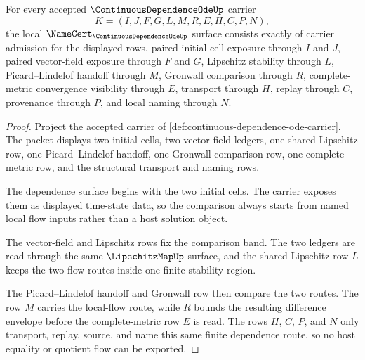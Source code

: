 \begin{theorem}
\label{thm:continuous-dependence-ode-namecert-obligations}
For every accepted $\ContinuousDependenceOdeUp$ carrier
$$
K=(I,J,F,G,L,M,R,E,H,C,P,N),
$$
the local $\NameCert_{\ContinuousDependenceOdeUp}$ surface consists exactly of carrier admission for the displayed rows, paired initial-cell exposure through $I$ and $J$, paired vector-field exposure through $F$ and $G$, Lipschitz stability through $L$, Picard--Lindelof handoff through $M$, Gronwall comparison through $R$, complete-metric convergence visibility through $E$, transport through $H$, replay through $C$, provenance through $P$, and local naming through $N$.
\end{theorem}
\begin{proof}
Project the accepted carrier of \autoref{def:continuous-dependence-ode-carrier}. The packet displays two initial cells, two vector-field ledgers, one shared Lipschitz row, one Picard--Lindelof handoff, one Gronwall comparison row, one complete-metric row, and the structural transport and naming rows.

The dependence surface begins with the two initial cells. The carrier exposes them as displayed time-state data, so the comparison always starts from named local flow inputs rather than a host solution object.

The vector-field and Lipschitz rows fix the comparison band. The two ledgers are read through the same $\LipschitzMapUp$ surface, and the shared Lipschitz row $L$ keeps the two flow routes inside one finite stability region.

The Picard--Lindelof handoff and Gronwall row then compare the two routes. The row $M$ carries the local-flow route, while $R$ bounds the resulting difference envelope before the complete-metric row $E$ is read. The rows $H$, $C$, $P$, and $N$ only transport, replay, source, and name this same finite dependence route, so no host equality or quotient flow can be exported.
\end{proof}

